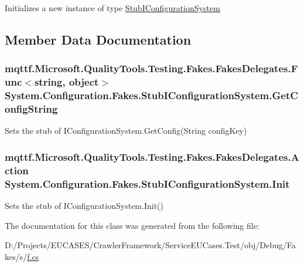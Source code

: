 Initializes a new instance of type \hyperlink{class_system_1_1_configuration_1_1_fakes_1_1_stub_i_configuration_system}{Stub\-I\-Configuration\-System}



\subsection{Member Data Documentation}
\hypertarget{class_system_1_1_configuration_1_1_fakes_1_1_stub_i_configuration_system_ab5f979cb65938f955fd592cc7281f160}{
\subsubsection[{Get\-Config\-String}]{\setlength{\rightskip}{0pt plus 5cm}mqttf.\-Microsoft.\-Quality\-Tools.\-Testing.\-Fakes.\-Fakes\-Delegates.\-Func$<$string, object$>$ System.\-Configuration.\-Fakes.\-Stub\-I\-Configuration\-System.\-Get\-Config\-String}}\label{class_system_1_1_configuration_1_1_fakes_1_1_stub_i_configuration_system_ab5f979cb65938f955fd592cc7281f160}


Sets the stub of I\-Configuration\-System.\-Get\-Config(\-String config\-Key)

\hypertarget{class_system_1_1_configuration_1_1_fakes_1_1_stub_i_configuration_system_a5870104f34b6c6241e05b220a75d5f68}{
\subsubsection[{Init}]{\setlength{\rightskip}{0pt plus 5cm}mqttf.\-Microsoft.\-Quality\-Tools.\-Testing.\-Fakes.\-Fakes\-Delegates.\-Action System.\-Configuration.\-Fakes.\-Stub\-I\-Configuration\-System.\-Init}}\label{class_system_1_1_configuration_1_1_fakes_1_1_stub_i_configuration_system_a5870104f34b6c6241e05b220a75d5f68}


Sets the stub of I\-Configuration\-System.\-Init()



The documentation for this class was generated from the following file\-:\begin{DoxyCompactItemize}
\item 
D\-:/\-Projects/\-E\-U\-C\-A\-S\-E\-S/\-Crawler\-Framework/\-Service\-E\-U\-Cases.\-Test/obj/\-Debug/\-Fakes/s/\hyperlink{s_2f_8cs}{f.\-cs}\end{DoxyCompactItemize}
